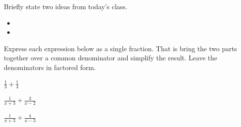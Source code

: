 \postClass

\begin{problem}
\item Briefly state two ideas from today's class.
  \begin{itemize}
  \item
  \item
  \end{itemize}
\item
  \begin{subproblem}
    \item
  \end{subproblem}
\end{problem}



\begin{problem}
\item Express each expression below as a single fraction. That is bring
  the two parts together over a common denominator and simplify the
  result. Leave the denominators in factored form.
  \begin{subproblem}
  \item ${\displaystyle \frac{1}{3} + \frac{1}{4}}$
    \vfill
  \item ${\displaystyle \frac{1}{x+3} + \frac{3}{x-2}}$
    \vfill
  \item ${\displaystyle \frac{1}{x+3} + \frac{4}{x-3}}$
    \vfill
  \end{subproblem}
\end{problem}


